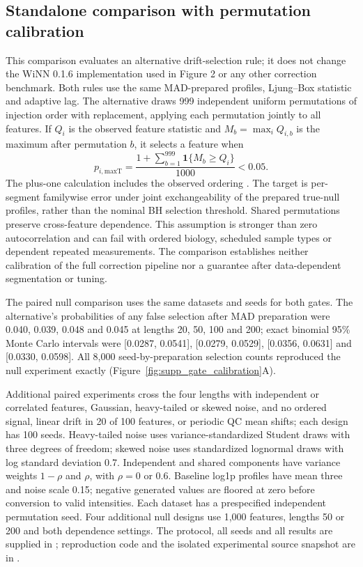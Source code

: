\documentclass[namedate,webpdf,modern,large,nocrop]{oup-authoring-template}
\begin{document}
\subsection{Standalone comparison with permutation calibration}

This comparison evaluates an alternative drift-selection rule; it does not change the WiNN 0.1.6 implementation used in Figure 2 or any other correction benchmark. Both rules use the same MAD-prepared profiles, Ljung--Box statistic and adaptive lag. The alternative draws 999 independent uniform permutations of injection order with replacement, applying each permutation jointly to all features. If \(Q_i\) is the observed feature statistic and \(M_b=\max_i Q_{i,b}\) is the maximum after permutation \(b\), it selects a feature when
\[
p_{i,\mathrm{maxT}}=\frac{1+\sum_{b=1}^{999}\mathbf{1}\{M_b\geq Q_i\}}{1000}<0.05.
\]
The plus-one calculation includes the observed ordering \citep{PhipsonSmyth2010,HemerikGoeman2018}. The target is per-segment familywise error under joint exchangeability of the prepared true-null profiles, rather than the nominal BH selection threshold. Shared permutations preserve cross-feature dependence. This assumption is stronger than zero autocorrelation and can fail with ordered biology, scheduled sample types or dependent repeated measurements. The comparison establishes neither calibration of the full correction pipeline nor a guarantee after data-dependent segmentation or tuning.

The paired null comparison uses the same datasets and seeds for both gates. The alternative's probabilities of any false selection after MAD preparation were 0.040, 0.039, 0.048 and 0.045 at lengths 20, 50, 100 and 200; exact binomial 95\% Monte Carlo intervals were [0.0287, 0.0541], [0.0279, 0.0529], [0.0356, 0.0631] and [0.0330, 0.0598]. All 8,000 seed-by-preparation selection counts reproduced the null experiment exactly (Figure~\ref{fig:supp_gate_calibration}A).

Additional paired experiments cross the four lengths with independent or correlated features, Gaussian, heavy-tailed or skewed noise, and no ordered signal, linear drift in 20 of 100 features, or periodic QC mean shifts; each design has 100 seeds. Heavy-tailed noise uses variance-standardized Student draws with three degrees of freedom; skewed noise uses standardized lognormal draws with log standard deviation 0.7. Independent and shared components have variance weights \(1-\rho\) and \(\rho\), with \(\rho=0\) or 0.6. Baseline log1p profiles have mean three and noise scale 0.15; negative generated values are floored at zero before conversion to valid intensities. Each dataset has a prespecified independent permutation seed. Four additional null designs use 1,000 features, lengths 50 or 200 and both dependence settings. The protocol, all seeds and all results are supplied in ; reproduction code and the isolated experimental source snapshot are in .
\end{document}
